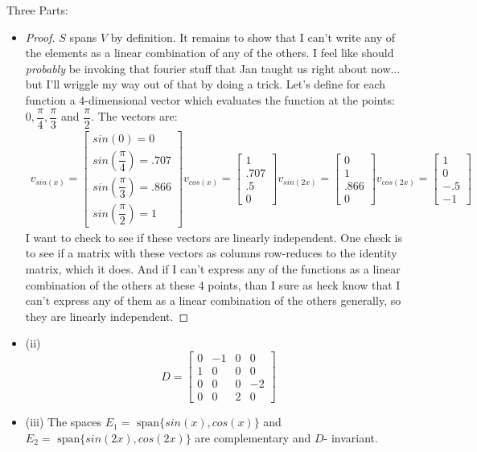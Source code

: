 \documentclass[12pt]{article}
\newenvironment{problem}[2][Problem]{\begin{trivlist}
\item[\hskip \labelsep {\bfseries #1}\hskip \labelsep {\bfseries #2.}]}{\end{trivlist}}
\theoremstyle{definition}
\theoremstyle{definition}
\theoremstyle{definition}
\theoremstyle{definition}
\begin{document}
\begin{problem}{4.8} Three Parts:
\begin{itemize}
\item
\begin{proof}
$S$ spans $V$ by definition. It remains to show that I can't write any of the elements as a linear combination of any of the others. I feel like should \textit{probably} be invoking that fourier stuff that Jan taught us right about now... but I'll wriggle my way out of that by doing a trick. Let's define for each function a 4-dimensional vector which evaluates the function at the points: $0 ,\dfrac{\pi}{4}, \dfrac{\pi}{3}$ and $\dfrac{\pi}{2}$. The vectors are: 
\begin{align*}
v_{sin(x)} = \begin{bmatrix}
sin(0) = 0 \\
sin(\dfrac{\pi}{4}) = .707 \\
sin(\dfrac{\pi}{3}) = .866 \\
sin(\dfrac{\pi}{2}) = 1
\end{bmatrix}
v_{cos(x)} = \begin{bmatrix}
1 \\
.707 \\
.5 \\
0
\end{bmatrix}
v_{sin(2x)} = \begin{bmatrix}
0 \\
1 \\
.866 \\
0
\end{bmatrix}
v_{cos(2x)} = \begin{bmatrix}
1 \\
0\\
-.5 \\
-1 
\end{bmatrix}
\end{align*}
I want to check to see if these vectors are linearly independent. One check is to see if a matrix with these vectors as columns row-reduces to the identity matrix, which it does. And if I can't express any of the functions as a linear combination of the others at these 4 points, than I sure as heck know that I can't express any of them as a linear combination of the others generally, so they are linearly independent.
\end{proof}
\item (ii) $$
D = \begin{bmatrix}
0 & -1 & 0 & 0 \\
1 & 0 & 0 & 0 \\
0 & 0 & 0 & -2 \\
0 & 0 & 2 & 0 
\end{bmatrix}
$$
\item (iii) The spaces $E_1 = \text{ span} \{ sin(x), cos(x) \}$ and $E_2 = \text{ span} \{ sin(2x), cos(2x) \}$ are complementary and $D$- invariant.
\end{itemize}
\end{problem}
\end{document}
